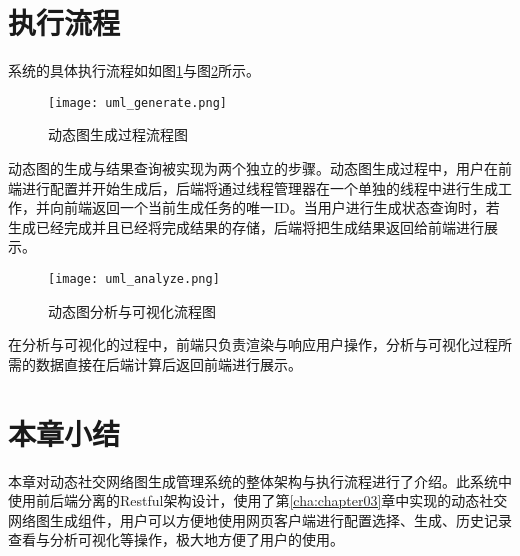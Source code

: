 \section{执行流程}





系统的具体执行流程如如图\ref{fig:uml_generate}与图\ref{fig:uml_analyze}所示。

\begin{figure}[H]
  \centering
  \texttt{[image: uml\_generate.png]}
  \caption{动态图生成过程流程图}
  \label{fig:uml_generate}
\end{figure}

动态图的生成与结果查询被实现为两个独立的步骤。动态图生成过程中，用户在前端进行配置并开始生成后，后端将通过线程管理器在一个单独的线程中进行生成工作，并向前端返回一个当前生成任务的唯一ID。当用户进行生成状态查询时，若生成已经完成并且已经将完成结果的存储，后端将把生成结果返回给前端进行展示。

\begin{figure}[H]
  \centering
  \texttt{[image: uml\_analyze.png]}
  \caption{动态图分析与可视化流程图}
  \label{fig:uml_analyze}
\end{figure}

在分析与可视化的过程中，前端只负责渲染与响应用户操作，分析与可视化过程所需的数据直接在后端计算后返回前端进行展示。

\section{本章小结}

本章对动态社交网络图生成管理系统的整体架构与执行流程进行了介绍。此系统中使用前后端分离的Restful架构设计，使用了第\ref{cha:chapter03}章中实现的动态社交网络图生成组件，用户可以方便地使用网页客户端进行配置选择、生成、历史记录查看与分析可视化等操作，极大地方便了用户的使用。